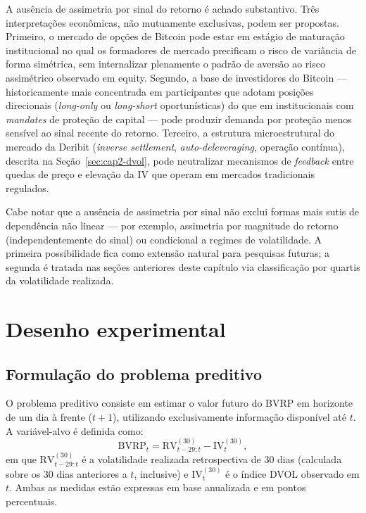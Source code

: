 A ausência de assimetria por sinal do retorno é achado substantivo. Três interpretações econômicas, não mutuamente exclusivas, podem ser propostas. Primeiro, o mercado de opções de Bitcoin pode estar em estágio de maturação institucional no qual os formadores de mercado precificam o risco de variância de forma simétrica, sem internalizar plenamente o padrão de aversão ao risco assimétrico observado em equity. Segundo, a base de investidores do Bitcoin --- historicamente mais concentrada em participantes que adotam posições direcionais (\textit{long-only} ou \textit{long-short} oportunísticas) do que em institucionais com \textit{mandates} de proteção de capital --- pode produzir demanda por proteção menos sensível ao sinal recente do retorno. Terceiro, a estrutura microestrutural do mercado da Deribit (\textit{inverse settlement}, \textit{auto-deleveraging}, operação contínua), descrita na Seção~\ref{sec:cap2-dvol}, pode neutralizar mecanismos de \textit{feedback} entre quedas de preço e elevação da IV que operam em mercados tradicionais regulados.

Cabe notar que a ausência de assimetria por sinal não exclui formas mais sutis de dependência não linear --- por exemplo, assimetria por magnitude do retorno (independentemente do sinal) ou condicional a regimes de volatilidade. A primeira possibilidade fica como extensão natural para pesquisas futuras; a segunda é tratada nas seções anteriores deste capítulo via classificação por quartis da volatilidade realizada.

\section{Desenho experimental}
\label{sec:cap6_desenho}
\label{sec:cap5_desenho}

\subsection{Formulação do problema preditivo}
\label{subsec:cap5_problema}

O problema preditivo consiste em estimar o valor futuro do BVRP em horizonte de
um dia à frente ($t+1$), utilizando exclusivamente informação disponível até $t$.
A variável-alvo é definida como:
\begin{equation}
\text{BVRP}_{t} = \text{RV}_{t-29:t}^{(30)} - \text{IV}_{t}^{(30)},
\label{eq:bvrp_def_cap6}
\end{equation}
em que $\text{RV}_{t-29:t}^{(30)}$ é a volatilidade realizada retrospectiva de 30 dias
(calculada sobre os 30 dias anteriores a $t$, inclusive) e $\text{IV}_{t}^{(30)}$ é
o índice DVOL observado em $t$. Ambas as medidas estão expressas em base anualizada
e em pontos percentuais.

